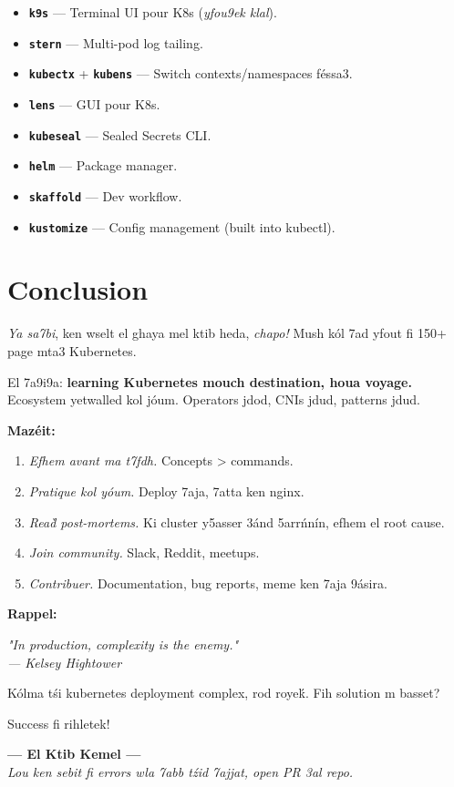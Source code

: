 \documentclass[11pt,a4paper]{book}
\newcommand{\tuni}[1]{\textit{\color{k8sdark}#1}}
\newcommand{\tech}[1]{\texttt{\color{k8sblue}\textbf{#1}}}
\begin{document}
\begin{itemize}
  \item \tech{k9s} --- Terminal UI pour K8s (\tuni{yfou9ek klal}).
  \item \tech{stern} --- Multi-pod log tailing.
  \item \tech{kubectx} + \tech{kubens} --- Switch contexts/namespaces f\'essa3.
  \item \tech{lens} --- GUI pour K8s.
  \item \tech{kubeseal} --- Sealed Secrets CLI.
  \item \tech{helm} --- Package manager.
  \item \tech{skaffold} --- Dev workflow.
  \item \tech{kustomize} --- Config management (built into kubectl).
\end{itemize}

\chapter*{Conclusion}

\tuni{Ya sa7bi}, ken wselt el ghaya mel ktib heda, \tuni{chapo!} Mush k\'ol 7ad yfout fi 150+ page mta3 Kubernetes.

El 7a9i9a: \textbf{learning Kubernetes mouch destination, houa voyage.} Ecosystem yetwalled kol j\'oum. Operators jdod, CNIs jdud, patterns jdud.

\textbf{Maz\'eit:}
\begin{enumerate}
  \item \tuni{Efhem avant ma t7fdh.} Concepts > commands.
  \item \tuni{Pratique kol y\'oum.} Deploy 7aja, 7atta ken nginx.
  \item \tuni{Rea\`d post-mortems.} Ki cluster y5asser 3\'and 5arr\'nn\'in, efhem el root cause.
  \item \tuni{Join community.} Slack, Reddit, meetups.
  \item \tuni{Contribuer.} Documentation, bug reports, meme ken 7aja 9\'asira.
\end{enumerate}

\textbf{Rappel:}
\begin{center}
\Large\itshape
\emph{"In production, complexity is the enemy."}\\
\normalfont\normalsize --- Kelsey Hightower
\end{center}

K\'olma t\'si kubernetes deployment complex, rod roye\'k. Fih solution m basset?

Success fi rihletek! 🚀

\vspace{1cm}
\begin{center}
\textbf{--- El Ktib Kemel ---}\\[0.3cm]
\small\textit{Lou ken sebit fi errors wla 7abb t\'zid 7ajjat, open PR 3al repo.}
\end{center}
\end{document}
